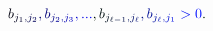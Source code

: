 \documentclass[12pt]{article}
\begin{document}
\makeatletter
\renewcommand*{\@textcolor}[3]{%
  \protect\leavevmode
  \begingroup
    \color#1{#2}#3%
  \endgroup
}
\makeatother
\begin{displaymath}
\mathcolor[RGB]{0,0,15}{b} _ { \mathcolor[RGB]{0,0,30}{j} _ { \mathcolor[RGB]{0,0,45}{1} } \mathcolor[RGB]{0,0,60}{,} \mathcolor[RGB]{0,0,75}{j} _ { \mathcolor[RGB]{0,0,90}{2} } } \mathcolor[RGB]{0,0,105}{,} \mathcolor[RGB]{0,0,120}{b} _ { \mathcolor[RGB]{0,0,135}{j} _ { \mathcolor[RGB]{0,0,150}{2} } \mathcolor[RGB]{0,0,165}{,} \mathcolor[RGB]{0,0,180}{j} _ { \mathcolor[RGB]{0,0,195}{3} } } \mathcolor[RGB]{0,0,210}{,} \mathcolor[RGB]{0,0,225}{.} \mathcolor[RGB]{0,0,240}{.} \mathcolor[RGB]{0,0,255}{.} \mathcolor[RGB]{0,15,0}{,} \mathcolor[RGB]{0,15,15}{b} _ { \mathcolor[RGB]{0,15,30}{j} _ { \mathcolor[RGB]{0,15,45}{\ell} \mathcolor[RGB]{0,15,60}{-} \mathcolor[RGB]{0,15,75}{1} } \mathcolor[RGB]{0,15,90}{,} \mathcolor[RGB]{0,15,105}{j} _ { \mathcolor[RGB]{0,15,120}{\ell} } } \mathcolor[RGB]{0,15,135}{,} \mathcolor[RGB]{0,15,150}{b} _ { \mathcolor[RGB]{0,15,165}{j} _ { \mathcolor[RGB]{0,15,180}{\ell} } \mathcolor[RGB]{0,15,195}{,} \mathcolor[RGB]{0,15,210}{j} _ { \mathcolor[RGB]{0,15,225}{1} } } \mathcolor[RGB]{0,15,240}{>} \mathcolor[RGB]{0,15,255}{0} \mathcolor[RGB]{0,30,0}{.}
\end{displaymath}
\end{document}
